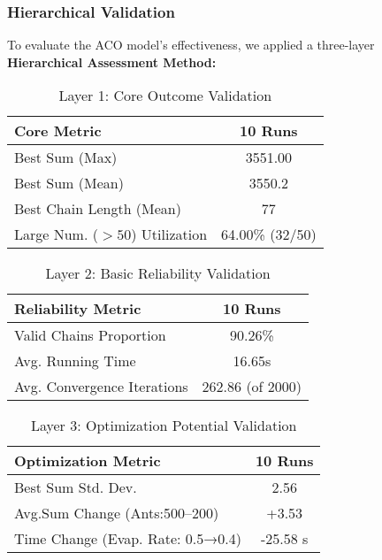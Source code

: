 \documentclass[twocolumn, a4paper]{article}
\begin{document}
\subsubsection{Hierarchical Validation}
To evaluate the ACO model's effectiveness, we applied a three-layer \textbf{Hierarchical Assessment Method:}
\begin{table}[htbp]
  \centering
  \setlength{\tabcolsep}{4pt} %
  \caption{Layer 1: Core Outcome Validation}
  \begin{tabular}{@{}lc@{}} %
    \toprule
    \textbf{Core Metric}         & \textbf{10 Runs} \\
    \midrule
    Best Sum (Max)               & 3551.00 \\
    Best Sum (Mean)              & 3550.2 \\
    Best Chain Length (Mean)     & 77 \\
    Large Num. ($>50$) Utilization & 64.00\% (32/50) \\
    \bottomrule
  \end{tabular}
\label{tab:core}
\end{table}
\begin{table}[htbp]
  \centering
  \setlength{\tabcolsep}{4pt}
  \caption{Layer 2: Basic Reliability Validation}
  \begin{tabular}{@{}lc@{}}
    \toprule
    \textbf{Reliability Metric}   & \textbf{10 Runs} \\
    \midrule
    Valid Chains Proportion       & 90.26\% \\
    Avg. Running Time             & 16.65s \\
    Avg. Convergence Iterations   & 262.86 (of 2000) \\
    \bottomrule
  \end{tabular}
\label{tab:reliability}
\end{table}
\begin{table}[htpb]
  \centering
  \setlength{\tabcolsep}{4pt}
  \caption{Layer 3: Optimization Potential Validation}
  \begin{tabular}{@{}lc@{}}
    \toprule
    \textbf{Optimization Metric}             & \textbf{10 Runs} \\
    \midrule
    Best Sum Std. Dev.                       & 2.56 \\
    Avg.Sum Change (Ants:500--200)            & +3.53  \\
    Time Change (Evap. Rate: 0.5→0.4)        & -25.58 s \\
    \bottomrule
  \end{tabular}
\label{tab:optimization}
\end{table}
\end{document}
